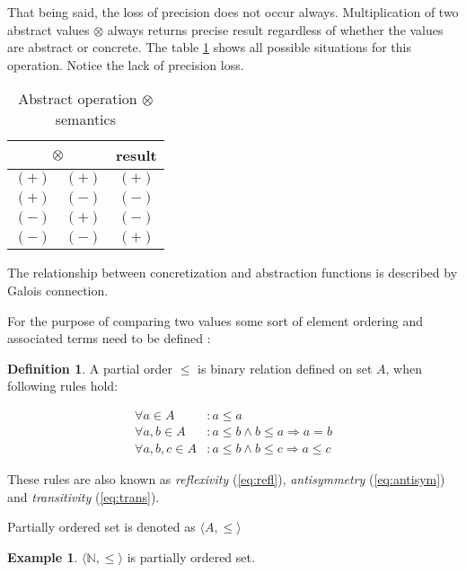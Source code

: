 \documentclass[12pt,final,oneside]{fithesis2}
\theoremstyle{definition}
\newtheorem{definition}{Definition}
\newtheorem{example}{Example}
\begin{document}
That being said, the loss of precision does not occur always. Multiplication
of two abstract values $\otimes$ always returns precise result regardless
of whether the values are abstract or concrete. The table
\ref{tab:abstractmult} shows all possible situations for this operation.
Notice the lack of precision loss.

\begin{table}[ht]
\centering
\begin{tabular}{c|c|c}
\multicolumn{2}{c|}{$\otimes$} & result \\
\hline
$(+)$ & $(+)$ & $(+)$ \\
$(+)$ & $(-)$ & $(-)$ \\
$(-)$ & $(+)$ & $(-)$ \\
$(-)$ & $(-)$ & $(+)$ \\
\end{tabular}
\caption{Abstract operation $\otimes$ semantics}
\label{tab:abstractmult}
\end{table}

The relationship between concretization and abstraction functions is
described by Galois connection.

For the purpose of comparing two values some sort of element ordering and
associated terms need to be defined \cite{Burris81-1}:

\begin{definition}
A partial order $\leq$ is binary relation defined on set $A$, when following
rules hold:

\begin{align}
\forall a \in A &: a \leq a \label{eq:refl} \\
\forall a, b \in A &: a \leq b \land b \leq a \Rightarrow a = b \label{eq:antisym} \\
\forall a, b, c \in A &: a \leq b \land b \leq c \Rightarrow a \leq c \label{eq:trans}
\end{align}

These rules are also known as \textit{reflexivity} (\ref{eq:refl}),
\textit{antisymmetry} (\ref{eq:antisym}) and \textit{transitivity} (\ref{eq:trans}).

Partially ordered set is denoted as $\langle A, \leq \rangle$
\end{definition}

\begin{example}
$\langle \mathbb{N}, \leq \rangle$ is partially ordered set.
\end{example}
\end{document}
